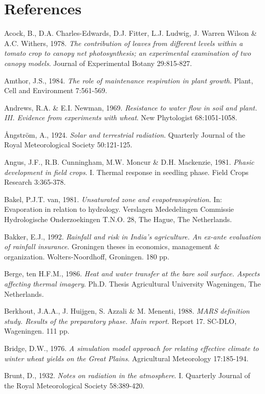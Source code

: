 \chapter{References}

Acock, B., D.A. Charles-Edwards, D.J. Fitter, L.J. Ludwig, J. Warren Wilson \& A.C.
Withers, 1978. {\it The contribution of leaves from different levels within a tomato crop to
canopy net photosynthesis; an experimental examination of two canopy models\/}. Journal of
Experimental Botany 29:815-827.

Amthor, J.S., 1984. {\it The role of maintenance respiration in plant growth\/}. Plant, Cell and
Environment 7:561-569. 

Andrews, R.A. \& E.I. Newman, 1969. {\it Resistance to water flow in soil and plant. III.
Evidence from experiments with wheat\/}. New Phytologist 68:1051-1058.

\AA ngstr\"{o}m, A., 1924. {\it Solar and terrestrial radiation\/}. Quarterly Journal of the Royal
Meteorological Society 50:121-125.

Angus, J.F., R.B. Cunningham, M.W. Moncur \& D.H. Mackenzie, 1981. {\it Phasic
development in field crops\/}. I. Thermal response in seedling phase. Field Crops Research
3:365-378.

Bakel, P.J.T. van, 1981. {\it Unsaturated zone and evapotranspiration\/}. In: Evaporation in
relation to hydrology. Verslagen Mededelingen Commissie Hydrologische Onderzoekingen
T.N.O. 28, The Hague, The Netherlands.

Bakker, E.J., 1992. {\it Rainfall and risk in India's agriculture. An ex-ante evaluation of rainfall
insurance\/}. Groningen theses in economics, management \& organization. Wolters-Noordhoff,
Groningen. 180 pp.

Berge, ten H.F.M., 1986. {\it Heat and water transfer at the bare soil surface. Aspects affecting
thermal imagery\/}. Ph.D. Thesis Agricultural University Wageningen, The Netherlands.

Berkhout, J.A.A., J. Huijgen, S. Azzali \& M. Menenti, 1988. {\it MARS definition study.
Results of the preparatory phase. Main report\/}. Report 17. SC-DLO, Wageningen. 111 pp.

Bridge, D.W., 1976. {\it A simulation model approach for relating effective climate to winter
wheat yields on the Great Plains\/}. Agricultural Meteorology 17:185-194.

Brunt, D., 1932. {\it Notes on radiation in the atmosphere\/}. I. Quarterly Journal of the Royal
Meteorological Society 58:389-420.

